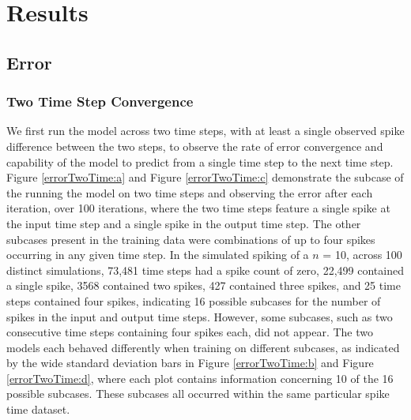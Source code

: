 \documentclass[11pt]{article}
\begin{document}
\section{Results}

\subsection{Error}

\subsubsection{Two Time Step Convergence}
We first run the model across two time steps, with at least a single observed spike difference between the two steps, to observe the rate of error convergence and capability of the model to predict from a single time step to the next time step. Figure \ref{errorTwoTime:a} and Figure \ref{errorTwoTime:c} demonstrate the subcase of the running the model on two time steps and observing the error after each iteration, over 100 iterations, where the two time steps feature a single spike at the input time step and a single spike in the output time step. The other subcases present in the training data were combinations of up to four spikes occurring in any given time step. In the simulated spiking of a $n$ = 10, across 100 distinct simulations, 73,481 time steps had a spike count of zero, 22,499 contained a single spike, 3568 contained two spikes, 427 contained three spikes, and 25 time steps contained four spikes, indicating 16 possible subcases for the number of spikes in the input and output time steps. However, some subcases, such as two consecutive time steps containing four spikes each, did not appear. The two models each behaved differently when training on different subcases, as indicated by the wide standard deviation bars in Figure \ref{errorTwoTime:b} and Figure \ref{errorTwoTime:d}, where each plot contains information concerning 10 of the 16 possible subcases. These subcases all occurred within the same particular spike time dataset.
\end{document}
